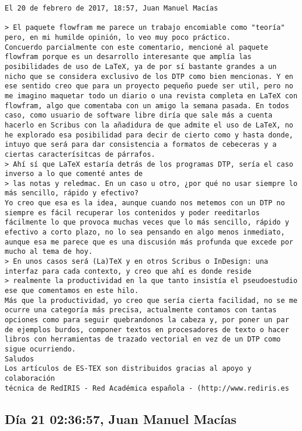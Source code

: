 \documentclass[a4paper,10pt]{article}
\begin{document}
\begin{lstlisting}
El 20 de febrero de 2017, 18:57, Juan Manuel Macías

> El paquete flowfram me parece un trabajo encomiable como "teoría" pero, en mi humilde opinión, lo veo muy poco práctico.
Concuerdo parcialmente con este comentario, mencioné al paquete
flowfram porque es un desarrollo interesante que amplía las
posibilidades de uso de LaTeX, ya de por sí bastante grandes a un
nicho que se considera exclusivo de los DTP como bien mencionas. Y en
ese sentido creo que para un proyecto pequeño puede ser util, pero no
me imagino maquetar todo un diario o una revista completa en LaTeX con
flowfram, algo que comentaba con un amigo la semana pasada. En todos
caso, como usuario de software libre diría que sale más a cuenta
hacerlo en Scribus con la añadidura de que admite el uso de LaTeX, no
he explorado esa posibilidad para decir de cierto como y hasta donde,
intuyo que será para dar consistencia a formatos de cebeceras y a
ciertas caracterísitcas de párrafos.
> Ahí sí que LaTeX estaría detrás de los programas DTP, sería el caso inverso a lo que comenté antes de
> las notas y reledmac. En un caso u otro, ¿por qué no usar siempre lo más sencillo, rápido y efectivo?
Yo creo que esa es la idea, aunque cuando nos metemos con un DTP no
siempre es fácil recuperar los contenidos y poder reeditarlos
fácilmente lo que provoca muchas veces que lo más sencillo, rápido y
efectivo a corto plazo, no lo sea pensando en algo menos inmediato,
aunque esa me parece que es una discusión más profunda que excede por
mucho al tema de hoy.
> En unos casos será (La)TeX y en otros Scribus o InDesign: una interfaz para cada contexto, y creo que ahí es donde reside
> realmente la productividad en la que tanto insistía el pseudoestudio ese que comentamos en este hilo.
Más que la productividad, yo creo que sería cierta facilidad, no se me
ocurre una categoría más precisa, actualmente contamos con tantas
opciones como para seguir quebrandonos la cabeza y, por poner un par
de ejemplos burdos, componer textos en procesadores de texto o hacer
libros con herramientas de trazado vectorial en vez de un DTP como
sigue ocurriendo.
Saludos
Los artículos de ES-TEX son distribuidos gracias al apoyo y colaboración 
técnica de RedIRIS - Red Académica española - (http://www.rediris.es

\end{lstlisting}

\subsection{Día 21 02:36:57, Juan Manuel Macías}
\end{document}
